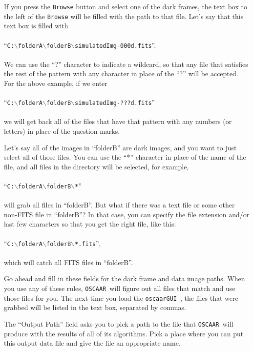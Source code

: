 \documentclass[a4paper]{article}
\newcommand{\code}[1]{\texttt{#1}}
\newcommand{\oscaar}{\code{OSCAAR}~}
\newcommand{\gui}{\code{oscaarGUI}~}
\begin{document}
If you press the \code{Browse} button and select one of the dark frames, the text box to the left of the \code{Browse} will be filled with the path to that file. Let's say that this text box is filled with 
\\\\
\noindent``\code{C:$\backslash$folderA$\backslash$folderB$\backslash$simulatedImg-000d.fits}''. 
\\\\
\noindent We can use the ``?'' character to indicate a wildcard, so that any file that satisfies the rest of the pattern with any character in place of the ``?'' will be accepted. For the above example, if we enter 
\\\\
\noindent ``\code{C:$\backslash$folderA$\backslash$folderB$\backslash$simulatedImg-???d.fits}'' 
\\\\
\noindent we will get back all of the files that have that pattern with any numbers (or letters) in place of the question marks. 

Let's say all of the images in ``folderB'' are dark images, and you want to just select all of those files. You can use the ``*'' character in place of the name of the file, and all files in the directory will be selected, for example, 
\\\\
\noindent ``\code{C:$\backslash$folderA$\backslash$folderB$\backslash$*}'' 
\\\\
\noindent will grab all files in ``folderB''. But what if there was a text file or some other non-FITS file in ``folderB''? In that case, you can specify the file extension and/or last few characters so that you get the right file, like this: 
\\\\
\noindent ``\code{C:$\backslash$folderA$\backslash$folderB$\backslash$*.fits}'', 
\\\\
\noindent which will catch all FITS files in ``folderB''.

Go ahead and fill in these fields for the dark frame and data image paths. When you use any of these rules, \oscaar will figure out all files that match and use those files for you. The next time you load the \gui, the files that were grabbed will be listed in the text box, separated by commas. 

The ``Output Path'' field asks you to pick a path to the file that \oscaar will produce with the results of all of its algorithms. Pick a place where you can put this output data file and give the file an appropriate name.
\end{document}
